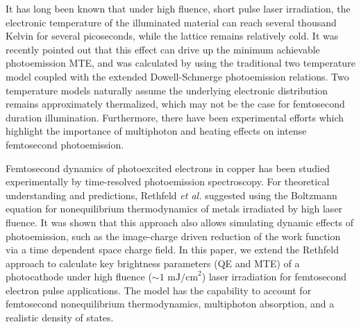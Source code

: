 It has long been known that under high fluence, short pulse laser irradiation, the electronic temperature of the illuminated material can reach several thousand Kelvin for several picoseconds, while the lattice remains relatively cold.\cite{Anisimov1974,Fann1993,Elsayed-Ali1987} It was recently pointed out that this effect can drive up the minimum achievable photoemission MTE, and was calculated by using the traditional two temperature model coupled with the extended Dowell-Schmerge photoemission relations.\cite{ttm} Two temperature models naturally assume the underlying electronic distribution remains approximately thermalized, which may not be the case for femtosecond duration illumination. Furthermore, there have been experimental efforts which highlight the importance of multiphoton and heating effects on intense femtosecond photoemission.\cite{Pasmans2016,An2018,Bartoli1997}

Femtosecond dynamics of photoexcited electrons in copper has been studied experimentally by time-resolved photoemission spectroscopy.\cite{Petek1999,Cao1997,Wolf1997}
For theoretical understanding and predictions, Rethfeld \textit{et al.} suggested using the Boltzmann equation for nonequilibrium thermodynamics of metals irradiated by high laser fluence.\cite{rethfeld,boltzmann,skin}
It was shown that this approach also allows simulating dynamic effects of photoemission, such as the image-charge driven reduction of the work function via a time dependent space charge field.\cite{rethfeld_schottky}
In this paper, we extend the Rethfeld approach to calculate key brightness parameters (QE and MTE) of a photocathode under high fluence ($\sim 1 \textrm{ mJ/cm}^2$) laser irradiation for femtosecond electron pulse applications. The model has the capability to account for femtosecond nonequilibrium thermodynamics, multiphoton absorption, and a realistic density of states. 









